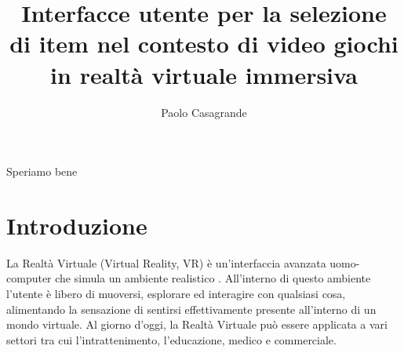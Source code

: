 \documentclass[target=bach,aauheader=]{thud}
\title{Interfacce utente per la selezione \\ di item nel contesto di video giochi \\ in realtà virtuale immersiva}
\author{Paolo Casagrande}
\begin{document}
\maketitle


\acknowledgements
Speriamo bene

\tableofcontents



\mainmatter

\chapter{Introduzione} %
La Realtà Virtuale (Virtual Reality, VR) è un'interfaccia avanzata uomo-computer che simula un ambiente realistico \cite{Zheng}.
All'interno di questo ambiente l'utente è libero di muoversi, esplorare ed interagire con qualsiasi cosa, alimentando la sensazione di sentirsi effettivamente presente all'interno di un mondo virtuale.
Al giorno d'oggi, la Realtà Virtuale può essere applicata a vari settori tra cui l'intrattenimento, l'educazione, medico e commerciale. \\
\end{document}
